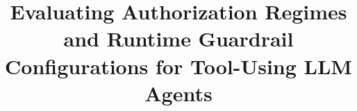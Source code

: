 \documentclass[preprint,12pt,a4paper]{elsarticle}
\newcommand{\ProjectRoot}{.}
\begin{document}
\begin{frontmatter}
\title{Evaluating Authorization Regimes and Runtime Guardrail Configurations for Tool-Using LLM Agents}
\begin{abstract}

\end{abstract}
\begin{keyword}

\end{keyword}
\end{frontmatter}











\end{document}
